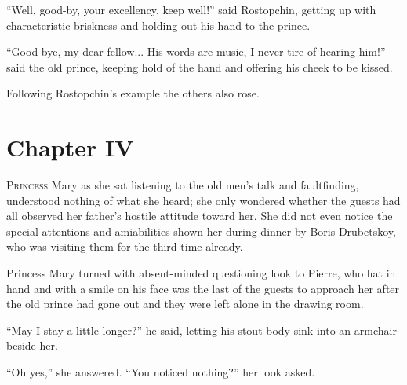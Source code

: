 ``Well, good-by, your excellency, keep well!'' said Rostopchin,
getting up with characteristic briskness and holding out his hand
to the prince.

``Good-bye, my dear fellow... His words are music, I never tire
of hearing him!'' said the old prince, keeping hold of the hand
and offering his cheek to be kissed.

Following Rostopchin's example the others also rose.


\chapter*{Chapter IV}
\ifaudio     
{} 
\fi

\lettrine[lines=2, loversize=0.3, lraise=0]{\initfamily P}{rincess}
Mary as she sat listening to the old men's talk and
faultfinding, understood nothing of what she heard; she only
wondered whether the guests had all observed her father's hostile
attitude toward her. She did not even notice the special
attentions and amiabilities shown her during dinner by Boris
Drubetskoy, who was visiting them for the third time already.

Princess Mary turned with absent-minded questioning look to
Pierre, who hat in hand and with a smile on his face was the last
of the guests to approach her after the old prince had gone out
and they were left alone in the drawing room.

``May I stay a little longer?'' he said, letting his stout body
sink into an armchair beside her.

``Oh yes,'' she answered. ``You noticed nothing?'' her look
asked.


